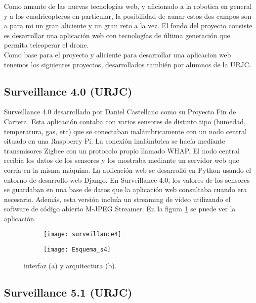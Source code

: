 Como amante de las nuevas tecnologías web, y aficionado a la robotica en general y a los cuadricopteros en particular, la posibilidad de aunar estos dos campos son a para mi un gran aliciente y un gran reto a la vez. El fondo del proyecto consiste es desarrollar una aplicación web con tecnologías de última generación que permita teleoperar el drone.\\

Como base para el proyecto y aliciente para desarrollar una aplicacion web tenemos los siguientes proyectos, desarrollados también por alumnos de la URJC.\\

\subsection{Surveillance 4.0 (URJC)}

Surveillance 4.0 desarrollado por Daniel Castellano como su Proyecto Fin de Carrera. Esta aplicación contaba con varios sensores de distinto tipo (humedad, temperatura, gas, etc) que se conectaban inalámbricamente con un nodo central situado en una Raspberry Pi. La conexión inalámbrica se hacía mediante transmisores Zigbee con un protocolo propio llamado WHAP. El nodo central recibía los datos de los sensores y los mostraba mediante un servidor web que corría en la misma máquina. La aplicación web se desarrolló en Python usando el entorno de desarrollo web Django. En Surveillance 4.0, los valores de los sensores se guardaban en una base de datos que la aplicación web consultaba cuando era necesario. Además, esta versión incluía un streaming de vídeo utilizando el software de código abierto M-JPEG Streamer. En la figura \ref{fig:surveillance4} se puede ver la aplicación.\\

\begin{figure}[h]
\centering
  \begin{subfigure}[]{110mm}
    \texttt{[image: surveillance4]}
  \end{subfigure}
  \hspace{5pt}
  \begin{subfigure}[]{110mm}
    \texttt{[image: Esquema\_s4]}
  \end{subfigure}
  \caption{interfaz (a) y arquitectura (b).}\label{fig:surveillance4}
\end{figure}



\subsection{Surveillance 5.1 (URJC)}

